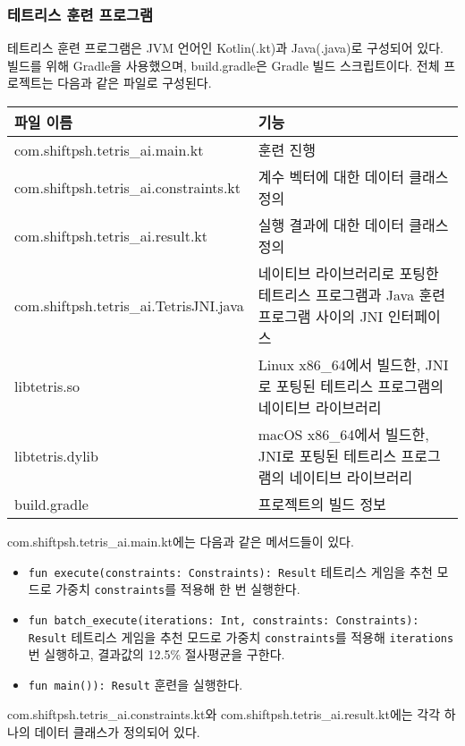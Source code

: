 \subsubsection{테트리스 훈련 프로그램}
테트리스 훈련 프로그램은 JVM 언어인 Kotlin(.kt)과 Java(.java)로 구성되어 있다. 빌드를 위해 Gradle을 사용했으며, build.gradle은 Gradle 빌드 스크립트이다.
전체 프로젝트는 다음과 같은 파일로 구성된다.

\begin{tabularx}{\linewidth}{l|X}
    파일 이름 & 기능 \\
    \hline
    com.shiftpsh.tetris\_ai.main.kt & 훈련 진행 \\
    com.shiftpsh.tetris\_ai.constraints.kt & 계수 벡터에 대한 데이터 클래스 정의 \\
    com.shiftpsh.tetris\_ai.result.kt & 실행 결과에 대한 데이터 클래스 정의 \\
    \hline
    com.shiftpsh.tetris\_ai.TetrisJNI.java & 네이티브 라이브러리로 포팅한 테트리스 프로그램과 Java 훈련 프로그램 사이의 JNI 인터페이스 \\
    \hline
    libtetris.so & Linux x86\_64에서 빌드한, JNI로 포팅된 테트리스 프로그램의 네이티브 라이브러리 \\
    libtetris.dylib & macOS x86\_64에서 빌드한, JNI로 포팅된 테트리스 프로그램의 네이티브 라이브러리 \\
    \hline
    build.gradle & 프로젝트의 빌드 정보 \\
\end{tabularx}

com.shiftpsh.tetris\_ai.main.kt에는 다음과 같은 메서드들이 있다.
\begin{itemize}
    \item \texttt{fun execute(constraints: Constraints): Result}
    테트리스 게임을 추천 모드로 가중치 \texttt{constraints}를 적용해 한 번 실행한다.
    \item \texttt{fun batch_execute(iterations: Int, constraints: Constraints): Result}
    테트리스 게임을 추천 모드로 가중치 \texttt{constraints}를 적용해 \texttt{iterations}번 실행하고, 결과값의 12.5\% 절사평균을 구한다.
    \item \texttt{fun main()): Result}
    훈련을 실행한다.
\end{itemize}

com.shiftpsh.tetris\_ai.constraints.kt와 com.shiftpsh.tetris\_ai.result.kt에는 각각 하나의 데이터 클래스가 정의되어 있다.

